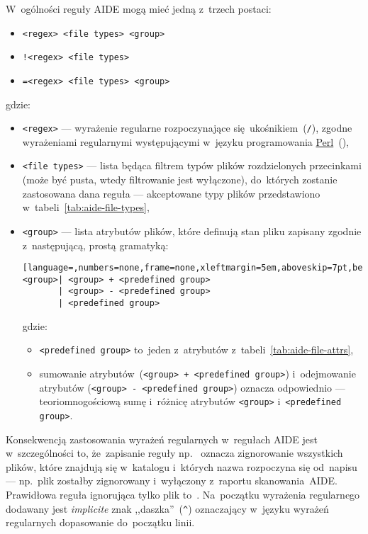 \documentclass[thesis]{subfiles}
\begin{document}
W~ogólności reguły AIDE mogą mieć jedną z~trzech postaci:\mynobreakpar
\begin{itemize}
	\item \texttt{<regex> <file types> <group>}
	\item \texttt{!<regex> <file types>}
	\item \texttt{=<regex> <file types> <group>}
\end{itemize}
gdzie:
\begin{itemize}
	\item \texttt{<regex>} --- wyrażenie regularne rozpoczynające się~ukośnikiem~(\texttt{/}), zgodne wyrażeniami regularnymi występującymi w~języku programowania \href{https://en.wikipedia.org/wiki/Perl}{Perl}~(),
	\item \texttt{<file types>} --- lista będąca filtrem typów plików rozdzielonych przecinkami (może być pusta, wtedy filtrowanie jest wyłączone), do~których zostanie zastosowana dana reguła --- akceptowane typy plików przedstawiono w~tabeli~\ref{tab:aide-file-types},
	\item \texttt{<group>} --- lista atrybutów plików, które definują stan pliku zapisany zgodnie z~następującą, prostą gramatyką:
\begin{lstlisting}[language=,numbers=none,frame=none,xleftmargin=5em,aboveskip=7pt,belowskip=0pt]
<group>| <group> + <predefined group>
       | <group> - <predefined group>
       | <predefined group>
\end{lstlisting}
	gdzie:\mynobreakpar
	\begin{itemize}
		\item \texttt{<predefined group>} to~jeden z~atrybutów z~tabeli~\ref{tab:aide-file-attrs},
		\item sumowanie atrybutów~(\texttt{<group> + <predefined group>}) i~odejmowanie atrybutów (\texttt{<group> - <predefined~group>}) oznacza odpowiednio --- teoriomnogościową sumę i~różnicę atrybutów \texttt{<group>} i~\texttt{<predefined group>}.
	\end{itemize}
\end{itemize}

Konsekwencją zastosowania wyrażeń regularnych w~regułach AIDE jest w~szczególności to, że~zapisanie reguły np.~ oznacza zignorowanie wszystkich plików, które znajdują się w~katalogu  i~których nazwa rozpoczyna się od~napisu  --- np.~plik  zostałby zignorowany i~wyłączony z~raportu skanowania~AIDE. Prawidłowa reguła ignorująca tylko plik  to~. Na~początku wyrażenia regularnego dodawany jest \emph{implicite} znak ,,daszka''~(\texttt{\textasciicircum}) oznaczający w~języku wyrażeń regularnych dopasowanie do~początku linii.
\end{document}
